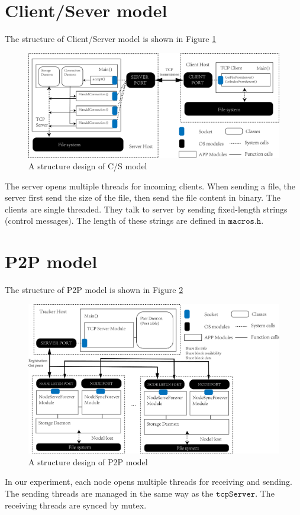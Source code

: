 \section{Client/Sever model}
The structure of Client/Server model is shown in Figure \ref{cs}
\begin{figure}[H]
	\centering
	\includegraphics[scale=0.23]{img/cs}
	\caption{A structure design of C/S model}
	\label{cs}
\end{figure}
The server opens multiple threads for incoming clients. When sending a file, the server first send the size of the file, then send the file content in binary. 
The clients are single threaded. They talk to server by sending fixed-length strings (control messages). The length of these strings are defined in $\mathtt{macros.h}$.

\section{P2P model}
The structure of P2P model is shown in Figure \ref{p2p}
\begin{figure}[H]
	\centering
	\includegraphics[scale=0.21]{img/p2p}
	\caption{A structure design of P2P model}
	\label{p2p}
\end{figure}
In our experiment, each node opens multiple threads for receiving and sending. The sending threads are managed in the same way as the $\mathtt{tcpServer}$. The receiving threads are synced by mutex.


